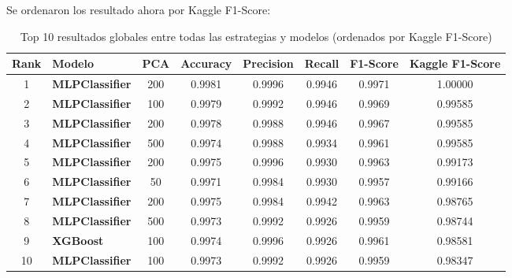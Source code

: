 \documentclass{article}
\begin{document}
Se ordenaron los resultado ahora por Kaggle F1-Score:

\begin{table}[H]
    \centering
    \begin{tabular}{|c|l|c|c|c|c|c|c|}
    \hline
    \rowcolor{tableblue} \textbf{Rank} & \textbf{Modelo} & \textbf{PCA} & \textbf{Accuracy} & \textbf{Precision} & \textbf{Recall} & \textbf{F1-Score} & \textbf{Kaggle F1-Score} \\
    \hline
    \rowcolor{purple!30} 1 & \textbf{MLPClassifier} & 200 & 0.9981 & 0.9996 & 0.9946 & 0.9971 & 1.00000 \\
    \hline
    \rowcolor{blue!20} 2 & \textbf{MLPClassifier} & 100 & 0.9979 & 0.9992 & 0.9946 & 0.9969 & 0.99585 \\
    \hline
    \rowcolor{purple!30} 3 & \textbf{MLPClassifier} & 200 & 0.9978 & 0.9988 & 0.9946 & 0.9967 & 0.99585 \\
    \hline
    \rowcolor{green!20} 4 & \textbf{MLPClassifier} & 500 & 0.9974 & 0.9988 & 0.9934 & 0.9961 & 0.99585 \\
    \hline
    \rowcolor{purple!30} 5 & \textbf{MLPClassifier} & 200 & 0.9975 & 0.9996 & 0.9930 & 0.9963 & 0.99173 \\
    \hline
    \rowcolor{orange!40} 6 & \textbf{MLPClassifier} & 50 & 0.9971 & 0.9984 & 0.9930 & 0.9957 & 0.99166 \\
    \hline
    \rowcolor{purple!30} 7 & \textbf{MLPClassifier} & 200 & 0.9975 & 0.9984 & 0.9942 & 0.9963 & 0.98765 \\
    \hline
    \rowcolor{green!20} 8 & \textbf{MLPClassifier} & 500 & 0.9973 & 0.9992 & 0.9926 & 0.9959 & 0.98744 \\
    \hline
    \rowcolor{yellow!60} 9 & \textbf{XGBoost} & 100 & 0.9974 & 0.9996 & 0.9926 & 0.9961 & 0.98581 \\
    \hline
    \rowcolor{blue!20} 10 & \textbf{MLPClassifier} & 100 & 0.9973 & 0.9992 & 0.9926 & 0.9959 & 0.98347 \\
    \hline
    \end{tabular}
    \caption{Top 10 resultados globales entre todas las estrategias y modelos (ordenados por Kaggle F1-Score)}
    \label{tab:top10_globales}
\end{table}
\end{document}

